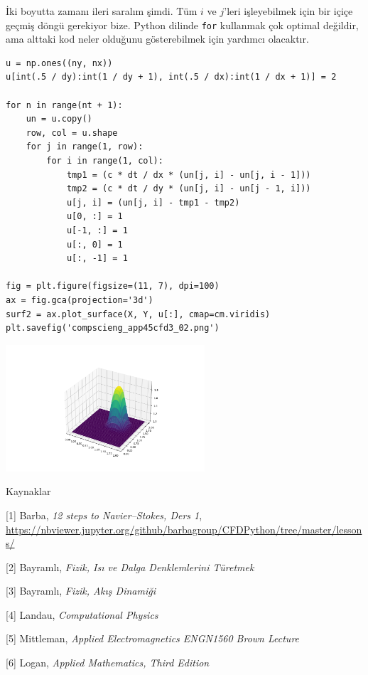 \documentclass[12pt,fleqn]{article}\usepackage{../../common}
\begin{document}
İki boyutta zamanı ileri saralım şimdi. Tüm $i$ ve $j$'leri işleyebilmek için
bir içiçe geçmiş döngü gerekiyor bize. Python dilinde \verb!for! kullanmak çok
optimal değildir, ama alttaki kod neler olduğunu gösterebilmek için yardımcı
olacaktır.


\begin{verbatim}
u = np.ones((ny, nx))
u[int(.5 / dy):int(1 / dy + 1), int(.5 / dx):int(1 / dx + 1)] = 2

for n in range(nt + 1): 
    un = u.copy()
    row, col = u.shape
    for j in range(1, row):
        for i in range(1, col):
            tmp1 = (c * dt / dx * (un[j, i] - un[j, i - 1]))
            tmp2 = (c * dt / dy * (un[j, i] - un[j - 1, i]))
            u[j, i] = (un[j, i] - tmp1 - tmp2)
            u[0, :] = 1
            u[-1, :] = 1
            u[:, 0] = 1
            u[:, -1] = 1

fig = plt.figure(figsize=(11, 7), dpi=100)
ax = fig.gca(projection='3d')
surf2 = ax.plot_surface(X, Y, u[:], cmap=cm.viridis)
plt.savefig('compscieng_app45cfd3_02.png')
\end{verbatim}

\includegraphics[width=20em]{compscieng_app45cfd3_02.png}

Kaynaklar

[1] Barba, {\em 12 steps to Navier–Stokes, Ders 1},
    \url{https://nbviewer.jupyter.org/github/barbagroup/CFDPython/tree/master/lessons/}

[2] Bayramlı, {\em Fizik, Isı ve Dalga Denklemlerini Türetmek}

[3] Bayramlı, {\em Fizik, Akış Dinamiği}

[4] Landau, {\em Computational Physics}

[5] Mittleman, {\em Applied Electromagnetics ENGN1560 Brown Lecture}

[6] Logan, {\em Applied Mathematics, Third Edition}
\end{document}
